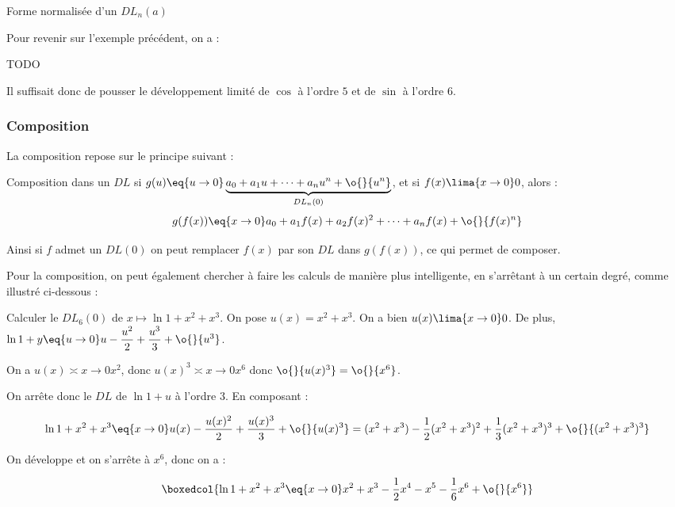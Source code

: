\documentclass[a4paper,french,bookmarks]{article}
\begin{document}
\begin{definition}{Forme normalisée d'un $DL_n(a)$}{}
    
\end{definition}

Pour revenir sur l'exemple précédent, on a :

TODO

Il suffisait donc de pousser le développement limité de $\cos$ à l'ordre $5$ et de $\sin$ à l'ordre 6.

\subsubsection{Composition}

La composition repose sur le principe suivant :

\begin{property}{Composition dans un $DL$}{}
si $g(u) \eq{u \to 0} \underbrace{a_0 + a_1u + \dots + a_nu^n + \o{}{u^n}}_{DL_n(0)}$, et si $f(x) \lima{x \to 0} 0$, alors :
\[ g(f(x)) \eq{x \to 0} a_0 + a_1f(x) + a_2f(x)^2 + \dots + a_nf(x) + \o{}{f(x)^n}\]
\end{property}


Ainsi si $f$ admet un $DL(0)$ on peut remplacer $f(x)$ par son $DL$ dans $g(f(x))$, ce qui permet de composer.

Pour la composition, on peut également chercher à faire les calculs de manière plus intelligente, en s'arrêtant à un certain degré, comme illustré ci-dessous :

\begin{example}{}{}
    Calculer le $DL_6(0)$ de $x \mapsto \ln{1+x^2+x^3}$.
    \tcblower
    On pose $u(x) = x^2+x^3$. On a bien $u(x) \lima{x \to 0} 0$.
    De plus, $\ln{1+y} \eq{u \to 0} u - \dfrac{u^2}{2} + \dfrac{u^3}{3} + \o{}{u^3}$.
    
    On a $u(x) \asymp{x \to 0} x^2$, donc $u(x)^3 \asymp{x \to 0} x^6$ donc $\o{}{u(x)^3} = \o{}{x^6}$.
    
    On arrête donc le $DL$ de $\ln{1+u}$ à l'ordre $3$. En composant :
    
    \[ \ln{1+x^2+x^3} \eq{x \to 0} u(x) - \dfrac{u(x)^2}{2}+\dfrac{u(x)^3}{3}+\o{}{u(x)^3}=(x^2+x^3) - \dfrac{1}{2}(x^2+x^3)^2 + \dfrac{1}{3}(x^2+x^3)^3 + \o{}{(x^2+x^3)^3}\]
    
    On développe et on s'arrête à $x^6$, donc on a :
    
    \[\boxedcol{\ln{1+x^2+x^3} \eq{x \to 0} x^2+x^3-\dfrac{1}{2}x^4 - x^5 - \dfrac{1}{6}x^6 + \o{}{x^6}}\]
\end{example}
\end{document}
